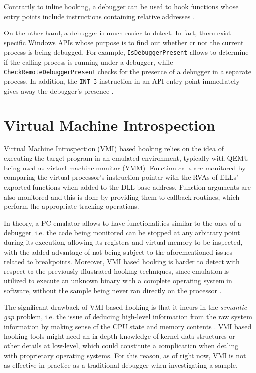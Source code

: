 Contrarily to inline hooking, a debugger can be used to hook functions whose entry points include instructions containing relative addresses \cite{Berdajs:2010:EAU:1815744.1815746}.

On the other hand, a debugger is much easier to detect. In fact, there exist specific Windows APIs whose purpose is to find out whether or not the current process is being debugged. For example, \texttt{IsDebuggerPresent} allows to determine if the calling process is running under a debugger, while \texttt{CheckRemoteDebuggerPresent} checks for the presence of a debugger in a separate process. 
In addition, the \texttt{INT 3} instruction in an API entry point immediately gives away the debugger's presence \cite{HookingDetection}.



\section{Virtual Machine Introspection}

Virtual Machine Introspection (VMI) based hooking relies on the idea of executing the target program in an emulated environment, typically with QEMU being used as virtual machine monitor (VMM). Function calls are monitored by comparing the virtual processor's instruction pointer with the RVAs of DLLs' exported functions when added to the DLL base address. Function arguments are also monitored and this is done by providing them to callback routines, which perform the appropriate tracking operations.

In theory, a PC emulator allows to have functionalities similar to the ones of a debugger, i.e. the code being monitored can be stopped at any arbitrary point during its execution, allowing its registers and virtual memory to be inspected, with the added advantage of not being subject to the aforementioned issues related to breakpoints.
Moreover, VMI based hooking is harder to detect with respect to the previously illustrated hooking techniques, since emulation is utilized to execute an unknown binary with a complete operating system in software, without the sample being never ran directly on the processor \cite{Bayer2005TTAnalyzeA}.

The significant drawback of VMI based hooking is that it incurs in the \textit{semantic gap} problem, i.e. the issue of deducing high-level information from the raw system information by making sense of the CPU state and memory contents \cite{Egele:2008:SAD:2089125.2089126}. VMI based hooking tools
might need an in-depth knowledge of kernel data structures or other details at low-level, which could constitute a complication when dealing with proprietary operating systems. For this reason, as of right now, VMI is not as effective in practice as a traditional debugger when investigating a sample.


